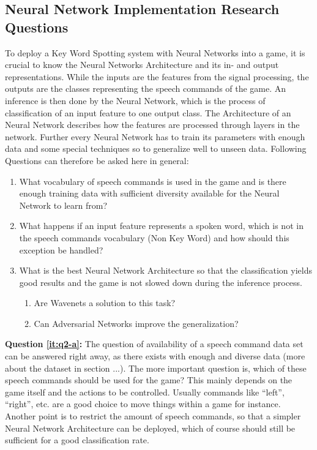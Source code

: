\subsection{Neural Network Implementation Research Questions}
To deploy a Key Word Spotting system with Neural Networks into a game, it is crucial to know the Neural Networks Architecture and its in- and output representations. 
While the inputs are the features from the signal processing, the outputs are the classes representing the speech commands of the game. 
An inference is then done by the Neural Network, which is the process of classification of an input feature to one output class.
The Architecture of an Neural Network describes how the features are processed through layers in the network.
Further every Neural Network has to train its parameters with enough data and some special techniques so to generalize well to unseen data.
Following Questions can therefore be asked here in general:

\begin{enumerate}[label={Q.2.\alph*)}, leftmargin=1.75cm]
    \item What vocabulary of speech commands is used in the game and is there enough training data with sufficient diversity available for the Neural Network to learn from?
    \label{it:q2-a}
    
    \item What happens if an input feature represents a spoken word, which is not in the speech commands vocabulary (Non Key Word) and how should this exception be handled?
    \label{it:q2-b}
    
    \item What is the best Neural Network Architecture so that the classification yields good results and the game is not slowed down during the inference process.
    \label{it:q2-c}
    \begin{enumerate}[label=(\roman*)]
        \item Are Wavenets a solution to this task? 
        \item Can Adversarial Networks improve the generalization?
    \end{enumerate}
    
\end{enumerate}
\noindent
\textbf{Question \ref{it:q2-a}:} The question of availability of a speech command data set can be answered right away, as there exists with enough and diverse data (more about the dataset in section ...). The more important question is, which of these speech commands should be used for the game? This mainly depends on the game itself and the actions to be controlled. Usually commands like \enquote{left}, \enquote{right}, etc. are a good choice to move things within a game for instance.
Another point is to restrict the amount of speech commands, so that a simpler Neural Network Architecture can be deployed, which of course should still be sufficient for a good classification rate.

